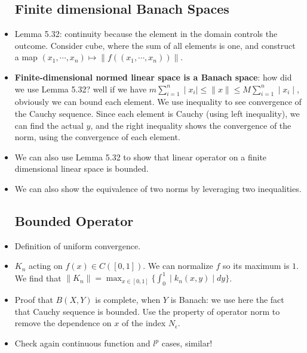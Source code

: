 \documentclass{article}
\theoremstyle{remark}
\begin{document}
\begin{itemize}
\subsection*{Finite dimensional Banach Spaces}
\item Lemma 5.32: continuity because the element in the domain controls the outcome. Consider cube, where the sum of all elements is one, and construct a map $(x_1,\cdots,x_n)\mapsto\lVert f((x_1,\cdots,x_n))\rVert$.
\item \textbf{Finite-dimensional normed linear space is a Banach space}: how did we use Lemma 5.32? well if we have $m\sum_{i=1}^n \mid x_i\mid\leq \lVert x\rVert\leq M\sum^n_{i=1}\mid x_i\mid$, obviously we can bound each element. We use inequality to see convergence of the Cauchy sequence. Since each element is Cauchy (using left inequality), we can find the actual $y$, and the right inequality shows the convergence of the norm, using the convergence of each element.
\item We can also use Lemma 5.32 to show that linear operator on a finite dimensional linear space is bounded.
\item We can also show the equivalence of two norms by leveraging two inequalities.
\subsection*{Bounded Operator}
\item Definition of uniform convergence.
\item $K_n$ acting on $f(x)\in C([0,1])$. We can normalize $f$ so its maximum is $1$. We find that $\lVert K_n\rVert=\max_{x\in [0,1]}\{\int^1_0\mid k_n (x,y)\mid dy\}$.
\item Proof that $B(X,Y)$ is complete, when $Y$ is Banach: we use here the fact that Cauchy sequence is bounded. Use the property of operator norm to remove the dependence on $x$ of the index $N_\epsilon$.
\item Check again continuous function and $l^p$ cases, similar!

\end{itemize}
\end{document}
